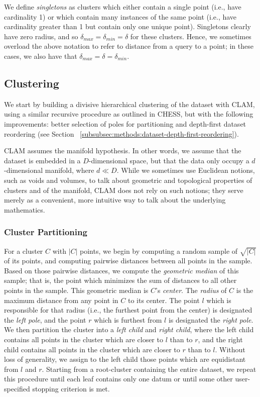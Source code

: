 We define \emph{singletons} as clusters which either contain a single point (i.e., have cardinality 1) or which contain 
many instances of the same point (i.e., have cardinality greater than 1 but contain only one unique point). Singletons clearly 
have zero radius, and so $\delta_{max} = \delta_{min} = \delta$ for these clusters. Hence, we sometimes overload the above 
notation to refer to distance from a query to a point; in these cases, we also have that $\delta_{max} = \delta = \delta_{min}$.


\subsection{Clustering}
\label{subsec:methods:clustering}

We start by building a divisive hierarchical clustering of the dataset with CLAM, using a 
similar recursive procedure as outlined in CHESS, but with the following 
improvements: better selection of poles for partitioning and depth-first dataset reordering 
(see Section ~\ref{subsubsec:methods:dataset-depth-first-reordering}). 


CLAM assumes the manifold hypothesis. 
In other words, we assume that the dataset is embedded in a $D$-dimensional space, but that the data only occupy 
a $d$-dimensional manifold, where $d \ll D$. 
While we sometimes use Euclidean notions, such as voids and volumes, to talk about geometric and topological 
properties of clusters and of the manifold, CLAM does not rely on such notions; 
they serve merely as a convenient, more intuitive way to talk about the underlying mathematics.

\subsubsection {Cluster Partitioning}

For a cluster $C$ with $|C|$ points, we begin by computing a 
random sample of $\sqrt{|C|}$ of its points, and computing pairwise distances 
between all points in the sample. Based on those pairwise distances, we compute the \emph{geometric median} of this sample; 
that is, the point which minimizes the sum of distances to all other points in the sample. This geometric median 
is $C$'s \emph{center}. The \emph{radius} of $C$ is the maximum distance from any point in $C$ to its center.
The point $l$ which is responsible for that radius (i.e., the furthest point from the center) is designated the \emph{left pole}, and the point $r$ which is furthest
from $l$ is designated the \emph{right pole}. We then partition the cluster into a \emph{left child} and \emph{right child}, where the 
left child contains all points in the cluster which are closer to $l$ than to $r$, and the right child contains all 
points in the cluster which are closer to $r$ than to $l$. Without loss of generality, we assign to the left child 
those points which are equidistant from $l$ and $r$. Starting from a root-cluster containing the entire dataset, we 
repeat this procedure until each leaf contains only one datum or until some other user-specified stopping criterion 
is met.


